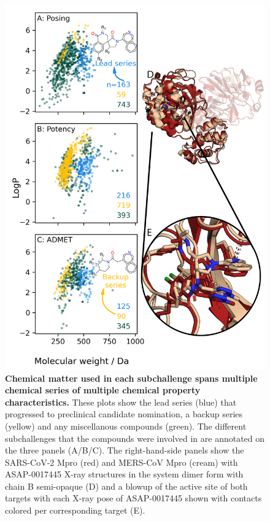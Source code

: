 \documentclass[journal=jcim,manuscript=article]{achemso}
\begin{document}
\begin{figure}
    \includegraphics[scale=0.9]{03_figs_data_preparation/subchallenge_physprops_with_scaffolds.png}
  \caption{\textbf{Chemical matter used in each subchallenge spans multiple chemical series of multiple chemical property characteristics.} These plots show the lead series (blue) that progressed to preclinical candidate nomination, a backup series (yellow) and any miscellanous compounds (green). The different subchallenges that the compounds were involved in are annotated on the three panels (A/B/C). The right-hand-side panels show the SARS-CoV-2 Mpro (red) and MERS-CoV Mpro (cream) with ASAP-0017445 X-ray structures in the system dimer form with chain B semi-opaque (D) and a blowup of the active site of both targets with each X-ray pose of ASAP-0017445 shown with contacts colored per corresponding target (E). }
  \label{fgr:physprops_scaffolds}
\end{figure}
\end{document}
